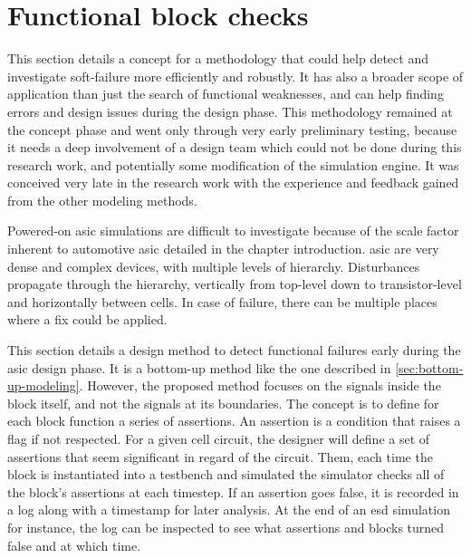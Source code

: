 \section{Functional block checks}

This section details a concept for a methodology that could help detect and investigate soft-failure more efficiently and robustly.
It has also a broader scope of application than just the search of functional weaknesses, and can help finding errors and design issues during the design phase.
This methodology remained at the concept phase and went only through very early preliminary testing, because it needs a deep involvement of a design team which could not be done during this research work, and potentially some modification of the simulation engine.
It was conceived very late in the research work with the experience and feedback gained from the other modeling methods.


Powered-on \gls{asic} simulations are difficult to investigate because of the scale factor inherent to automotive \gls{asic} detailed in the chapter introduction.
\gls{asic} are very dense and complex devices, with multiple levels of hierarchy.
Disturbances propagate through the hierarchy, vertically from top-level down to transistor-level and horizontally between cells.
In case of failure, there can be multiple places where a fix could be applied.

This section details a design method to detect functional failures early during the \gls{asic} design phase.
It is a bottom-up method like the one described in \ref{sec:bottom-up-modeling}.
However, the proposed method focuses on the signals inside the block itself, and not the signals at its boundaries.
The concept is to define for each block function a series of assertions.
An assertion is a condition that raises a flag if not respected.
For a given cell circuit, the designer will define a set of assertions that seem significant in regard of the circuit.
Them, each time the block is instantiated into a testbench and simulated the simulator checks all of the block's assertions at each timestep.
If an assertion goes false, it is recorded in a log along with a timestamp for later analysis.
At the end of an \gls{esd} simulation for instance, the log can be inspected to see what assertions and blocks turned false and at which time.

